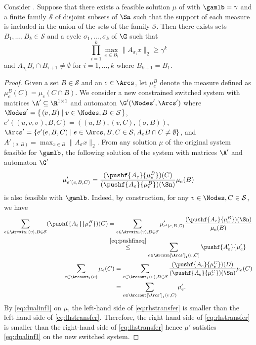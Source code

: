 \documentclass[11pt,twoside,a4paper,openright]{uclouvain-thesis}
\begin{document}
\begin{myprop}
  \label{prop:Bsc}
  Consider .
  Suppose that there exists a feasible solution $\mu$ of  with $\gamlb = \gamma$
  and a finite family $\mathcal{S}$ of disjoint subsets of $\Sn$ such that
  the support of each measure is included in the union of the sets of the family $\mathcal{S}$.
  Then there exists sets $B_1, \ldots, B_k \in \mathcal{S}$ and a cycle $\sigma_1, \ldots, \sigma_k$ of $\G$ such that
  \[ \prod_{i=1}^k \max_{x \in B_i} \|A_{\sigma_i} x\|_2 \geq \gamma^k \]
  and $A_{\sigma_i} B_i \cap B_{i+1} \neq \emptyset$ for $i=1, \ldots, k$ where $B_{k+1}=B_1$.
  \begin{proof}
    Given a set $B \in \mathcal{S}$ and an \arc{} $e \in \Arcs$, let $\mu_e^B$ denote the measure defined as $\mu_e^B(C) = \mu_e(C \cap B)$.
    We consider a new constrained switched system with matrices $\A' \subseteq \R^{1 \times 1}$ and automaton $\G'(\Nodes', \Arcs')$
    where $\Nodes' = \{\, (v,B) \mid v \in \Nodes, B \in \mathcal{S} \,\}$,
    $e'((u,v,\sigma), B, C) = ((u,B), (v,C), (\sigma,B))$,
    $\Arcs' = \{ e'(e, B, C) \mid e \in \Arcs, B, C \in \mathcal{S}, A_e B \cap C \neq \emptyset \}$,
    and $A'_{(\sigma,B)} = \max_{x \in B} \|A_\sigma x\|_2$.
    From any solution $\mu$ of the original system feasible for $\gamlb$, the following solution of the system with matrices $\A'$ and automaton $\G'$
    \[ \mu'_{e'(e,B,C)} = \frac{(\pushf{A_e}{\mu_e^B})(C)}{(\pushf{A_e}{\mu_e^B})(\Sn)} \mu_e(B) \]
    is also feasible with $\gamlb$.
    Indeed, by construction, for any $v \in \Nodes, C \in \mathcal{S}$, we have
    \begin{align}
        \label{eq:lhstransfer}
        \begin{split}
        \sum_{e \in \Arcsin_{1}(v), B \in \mathcal{S}} (\pushf{A_e}{\mu_e^B})(C)
        & =
        \sum_{e \in \Arcsin_{1}(v), B \in \mathcal{S}} \mu_{e'(e, B, C)}' \frac{(\pushf{A_e}{\mu_e^B})(\Sn)}{\mu_e(B)}\\
        & \stackrel{\eqref{eq:pushfineq}}{\leq}
        \sum_{e \in \Arcsin[\Arcs']_1(v, C)} \pushf{A'_{e}}{\mu_{e}'}
        \end{split}\\
        \label{eq:rhstransfer}
        \begin{split}
        \sum_{e \in \Arcsout_1(v)} \mu_e(C)
        & =
        \sum_{e \in \Arcsout_1(v), D \in \mathcal{S}} \frac{(\pushf{A_e}{\mu_e^C})(D)}{(\pushf{A_e}{\mu_e^C})(\Sn)} \mu_e(C)\\
        & =
        \sum_{e \in \Arcsout[\Arcs']_1(v, C)} \mu_{e}'.
        \end{split}
    \end{align}
    By \eqref{eq:dualinf1} on $\mu$, the left-hand side of \eqref{eq:rhstransfer} is smaller than
    the left-hand side of \eqref{eq:lhstransfer}.
    Therefore, the right-hand side of \eqref{eq:rhstransfer} is smaller than the right-hand side of \eqref{eq:lhstransfer}
    hence $\mu'$ satisfies \eqref{eq:dualinf1} on the new switched system.


\end{proof}
\end{myprop}
\end{document}
